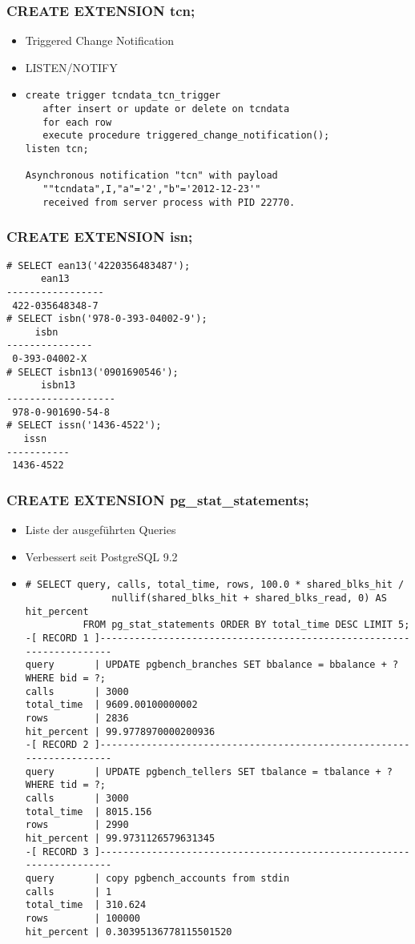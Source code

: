 \documentclass[utf8,hyperref={pdftex,colorlinks,linkcolor=black,citecolor=black,urlcolor=black,filecolor=black,plainpages=false},xcolor=table,hyperref]{beamer}
\begin{document}
\begin{frame}[containsverbatim]
	\frametitle{CREATE EXTENSION tcn;}
	\begin{itemize}
		\item Triggered Change Notification
		\item LISTEN/NOTIFY
		\item \begin{verbatim}
create trigger tcndata_tcn_trigger
   after insert or update or delete on tcndata
   for each row
   execute procedure triggered_change_notification();
listen tcn;

Asynchronous notification "tcn" with payload
   ""tcndata",I,"a"='2',"b"='2012-12-23'"
   received from server process with PID 22770.
\end{verbatim}
\end{itemize}
\end{frame}

\begin{frame}[containsverbatim]
	\frametitle{CREATE EXTENSION isn;}
	\begin{verbatim}
# SELECT ean13('4220356483487');
      ean13      
-----------------
 422-035648348-7
# SELECT isbn('978-0-393-04002-9');
     isbn      
---------------
 0-393-04002-X
# SELECT isbn13('0901690546');
      isbn13       
-------------------
 978-0-901690-54-8
# SELECT issn('1436-4522');
   issn    
-----------
 1436-4522
 \end{verbatim}
\end{frame}

\begin{frame}[containsverbatim]
	\frametitle{CREATE EXTENSION pg_stat_statements;}
	\begin{itemize}
		\item Liste der ausgeführten Queries
		\item Verbessert seit PostgreSQL 9.2
		\item \scriptsize \begin{verbatim}
# SELECT query, calls, total_time, rows, 100.0 * shared_blks_hit /
               nullif(shared_blks_hit + shared_blks_read, 0) AS hit_percent
          FROM pg_stat_statements ORDER BY total_time DESC LIMIT 5;
-[ RECORD 1 ]---------------------------------------------------------------------
query       | UPDATE pgbench_branches SET bbalance = bbalance + ? WHERE bid = ?;
calls       | 3000
total_time  | 9609.00100000002
rows        | 2836
hit_percent | 99.9778970000200936
-[ RECORD 2 ]---------------------------------------------------------------------
query       | UPDATE pgbench_tellers SET tbalance = tbalance + ? WHERE tid = ?;
calls       | 3000
total_time  | 8015.156
rows        | 2990
hit_percent | 99.9731126579631345
-[ RECORD 3 ]---------------------------------------------------------------------
query       | copy pgbench_accounts from stdin
calls       | 1
total_time  | 310.624
rows        | 100000
hit_percent | 0.30395136778115501520
\end{verbatim}
\end{itemize}
\end{frame}
\end{document}
